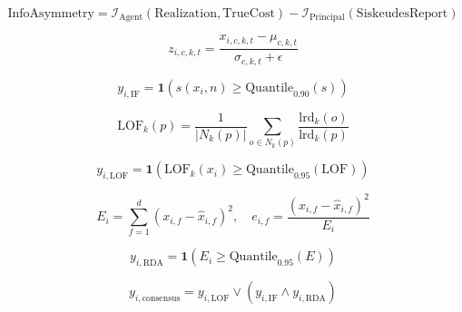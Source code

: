 $$\mathrm{InfoAsymmetry} = \mathcal{I}_{\mathrm{Agent}}(\mathrm{Realization}, \mathrm{TrueCost}) - \mathcal{I}_{\mathrm{Principal}}(\mathrm{SiskeudesReport})$$

$$z_{i,c,k,t} = \frac{x_{i,c,k,t} - \mu_{c,k,t}}{\sigma_{c,k,t} + \epsilon}$$

$$y_{i, \mathrm{IF}} = \mathbf{1}\left(s(x_i, n) \ge \mathrm{Quantile}_{0.90}(s)\right)$$

$$\mathrm{LOF}_k(p) = \frac{1}{|N_k(p)|} \sum_{o \in N_k(p)} \frac{\mathrm{lrd}_k(o)}{\mathrm{lrd}_k(p)}$$

$$y_{i, \mathrm{LOF}} = \mathbf{1}\left(\mathrm{LOF}_k(x_i) \ge \mathrm{Quantile}_{0.95}(\mathrm{LOF})\right)$$

$$E_i = \sum_{f=1}^{d} (x_{i,f} - \hat{x}_{i,f})^2, \quad e_{i,f} = \frac{(x_{i,f} - \hat{x}_{i,f})^2}{E_i}$$

$$y_{i, \mathrm{RDA}} = \mathbf{1}\left(E_i \ge \mathrm{Quantile}_{0.95}(E)\right)$$

$$y_{i, \mathrm{consensus}} = y_{i, \mathrm{LOF}} \lor \left(y_{i, \mathrm{IF}} \land y_{i, \mathrm{RDA}}\right)$$
